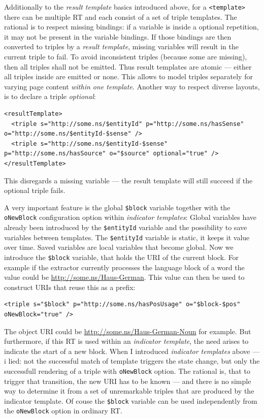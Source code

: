 Additionally to the \textit{result template} basics introduced above, for a \texttt{<template>} there can be multiple RT and each consist of a set of triple templates. 
The rational is to respect missing bindings: if a variable is inside a optional repetition, it may not be present in the variable bindings. 
If those bindings are then converted to triples by a \textit{result template}, missing variables will result in the current triple to fail. 
To avoid inconsistent triples (because some are missing), then all triples shall not be emitted. 
Thus result templates are atomic --- either all triples inside are emitted or none. 
This allows to model triples separately for varying page content \textit{within one template}.
Another way to respect diverse layouts, is to declare a triple \textit{optional}:
\begin{lstlisting}[style=XML]
<resultTemplate>
  <triple s="http://some.ns/$entityId" p="http://some.ns/hasSense" o="http://some.ns/$entityId-$sense" />
  <triple s="http://some.ns/$entityId-$sense" p="http://some.ns/hasSource" o="$source" optional="true" />
</resultTemplate>
\end{lstlisting}
This disregards a missing variable --- the result template will still succeed if the optional triple fails.

A very important feature is the global \texttt{\$block} variable together with the \texttt{oNewBlock} configuration option within \textit{indicator templates}:
Global variables have already been introduced by the \texttt{\$entityId} variable and the possibility to save variables between templates. 
The \texttt{\$entityId} variable is static, it keeps it value over time. 
Saved variables are local variables that become global. 
Now we introduce the \texttt{\$block} variable, that holds the URI of the current block. 
For example if the extractor currently processes the language block of a word the value could be \url{http://some.ns/Haus-German}. 
This value can then be used to construct URIs that reuse this as a prefix:
\begin{lstlisting}[style=XML]
<triple s="$block" p="http://some.ns/hasPosUsage" o="$block-$pos" oNewBlock="true" />
\end{lstlisting}
The object URI could be \url{http://some.ns/Haus-German-Noun} for example. 
But furthermore, if this RT is used within an \textit{indicator template}, the need arises to indicate the start of a new block. 
When I introduced \textit{indicator templates} above --- i lied: not the successful match of template triggers the state change, but only the successfull rendering of a triple with \texttt{oNewBlock} option. 
The rational is, that to trigger that transition, the new URI has to be known --- and there is no simple way to determine it from a set of unremarkable triples that are produced by the indicator template.
Of couse the \texttt{\$block} variable can be used independently from the \texttt{oNewBlock} option in ordinary RT.
\newpage


